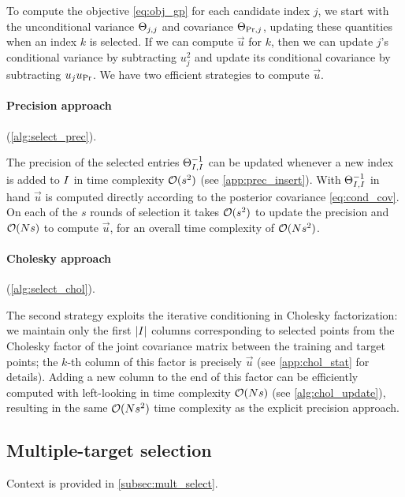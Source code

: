 \documentclass[review,supplement,onefignum,onetabnum]{siamonline220329}
\begin{document}
To compute the objective \cref{eq:obj_gp} for each candidate index \( j \),
we start with the unconditional variance \( \Theta_{j, j} \) and covariance \(
\Theta_{\text{Pr}, j} \), updating these quantities when an index \( k \) is selected.
If we can compute \( \vec{u} \) for \( k \), then we can update
\( j \)'s conditional variance by subtracting \( u_j^2 \) and
update its conditional covariance by subtracting \( u_j u_{\text{Pr}} \).
We have two efficient strategies to compute \( \vec{u} \).

\paragraph{Precision approach}
(\cref{alg:select_prec}).

The precision of the selected entries \( \Theta_{I, I}^{-1} \)
can be updated whenever a new index is added to \( I \) in
time complexity \( \mathcal{O}(s^2) \) (see \cref{app:prec_insert}).
With \( \Theta_{I, I}^{-1} \) in hand \( \vec{u} \) is computed
directly according to the posterior covariance \cref{eq:cond_cov}.
On each of the \( s \) rounds of selection it takes \( \mathcal{O}(s^2)
\) to update the precision and \( \mathcal{O}(Ns) \) to compute \(
\vec{u} \), for an overall time complexity of \( \mathcal{O}(N s^2) \).

\paragraph{Cholesky approach}
(\cref{alg:select_chol}).

The second strategy exploits the iterative conditioning in Cholesky
factorization: we maintain only the first \( \lvert I\rvert \) columns corresponding
to selected points from the Cholesky factor of the joint covariance matrix
between the training and target points; the \( k \)-th column of this factor
is precisely \( \vec{u} \) (see \cref{app:chol_stat} for details).
Adding a new column to the end of this factor can
be efficiently computed with left-looking in time complexity \( \mathcal{O}(N s) \)
(see \cref{alg:chol_update}), resulting in the same \( \mathcal{O}(N s^2) \) time
complexity as the explicit precision approach.

\subsection{Multiple-target selection}
\label{app:mult_select}

Context is provided in \cref{subsec:mult_select}.
\end{document}
